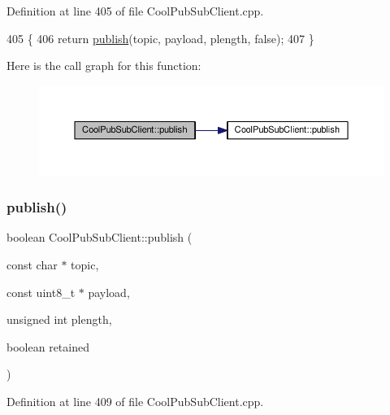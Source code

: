 Definition at line 405 of file Cool\+Pub\+Sub\+Client.\+cpp.


\begin{DoxyCode}
405                                                                                                  \{
406     \textcolor{keywordflow}{return} \hyperlink{class_cool_pub_sub_client_ab6ad5fa2d3db8f91454027257f225a89}{publish}(topic, payload, plength, \textcolor{keyword}{false});
407 \}
\end{DoxyCode}
Here is the call graph for this function\+:\nopagebreak
\begin{figure}[H]
\begin{center}
\leavevmode
\includegraphics[width=350pt]{d8/d4b/class_cool_pub_sub_client_abf184c0968a6655b68b5fdfbbc0c87d1_cgraph}
\end{center}
\end{figure}
\mbox{\label{class_cool_pub_sub_client_adef968760eb87b70e3fed03e60da76f7}} 
\subsubsection{\texorpdfstring{publish()}{publish()}\hspace{0.1cm}{\footnotesize\ttfamily [4/4]}}
{\footnotesize\ttfamily boolean Cool\+Pub\+Sub\+Client\+::publish (\begin{DoxyParamCaption}\item[{const char $\ast$}]{topic,  }\item[{const uint8\+\_\+t $\ast$}]{payload,  }\item[{unsigned int}]{plength,  }\item[{boolean}]{retained }\end{DoxyParamCaption})}



Definition at line 409 of file Cool\+Pub\+Sub\+Client.\+cpp.


